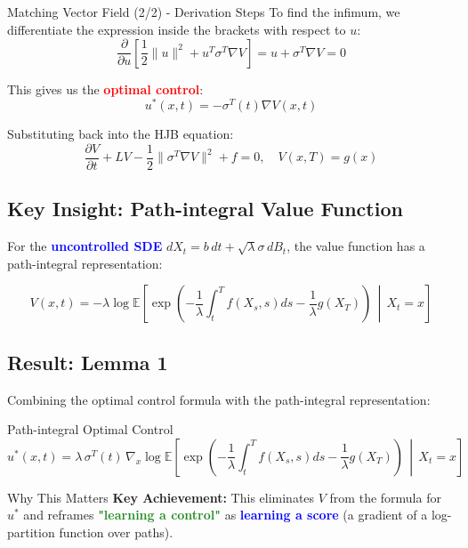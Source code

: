 \documentclass[aspectratio=169,xcolor=dvipsnames]{beamer}
\begin{document}
\begin{frame}[allowframebreaks]{Matching Vector Field (2/2) - Derivation Steps}
    To find the infimum, we differentiate the expression inside the brackets with respect to $u$:
    $$\frac{\partial}{\partial u}\left[\frac{1}{2}\|u\|^2 + u^T \sigma^T \nabla V\right] = u + \sigma^T \nabla V = 0$$
    
    This gives us the \textcolor{red}{\textbf{optimal control}}:
    $$u^*(x,t) = -\sigma^T(t)\nabla V(x,t)$$
    
    Substituting back into the HJB equation:
    $$\frac{\partial V}{\partial t} + LV - \frac{1}{2}\|\sigma^T \nabla V\|^2 + f = 0, \quad V(x,T) = g(x)$$
    
    \vspace{0.8cm}
    
    \subsection*{Key Insight: Path-integral Value Function}
    
    For the \textcolor{blue}{\textbf{uncontrolled SDE}} $dX_t = b \, dt + \sqrt{\lambda} \sigma \, dB_t$, the value function has a path-integral representation:
    
    $$V(x,t) = -\lambda \log \mathbb{E}\left[\exp\left(-\frac{1}{\lambda}\int_t^T f(X_s,s) ds - \frac{1}{\lambda} g(X_T)\right) \,\middle|\, X_t = x\right]$$
    
    \vspace{0.8cm}
    
    \subsection*{Result: Lemma 1}
    
    Combining the optimal control formula with the path-integral representation:
    
    \begin{alertblock}{Path-integral Optimal Control}
        $$u^*(x,t) = \lambda \, \sigma^T(t) \, \nabla_x \log \mathbb{E}\left[\exp\left(-\frac{1}{\lambda}\int_t^T f(X_s,s) ds - \frac{1}{\lambda} g(X_T)\right) \,\middle|\, X_t = x\right]$$
    \end{alertblock}
    
    \vspace{0.8cm}
    
    \begin{block}{Why This Matters}
        \textbf{Key Achievement:} This eliminates $V$ from the formula for $u^*$ and reframes \textcolor{ForestGreen}{\textbf{"learning a control"}} as \textcolor{blue}{\textbf{learning a score}} (a gradient of a log-partition function over paths).
        

\end{block}
\end{frame}
\end{document}
